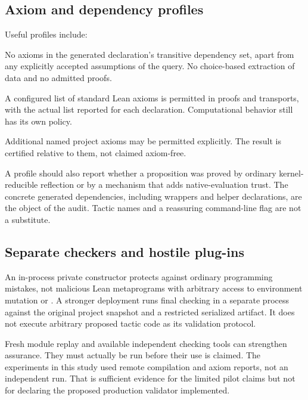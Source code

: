 \documentclass[11pt,a4paper]{article}
\newcommand{\code}[1]{\texttt{\detokenize{#1}}}
\theoremstyle{remark}
\begin{document}
\subsection{Axiom and dependency profiles}

Useful profiles include:
\begin{description}[style=nextline,leftmargin=1.5em]
\item[Strict constructive] No axioms in the generated declaration's transitive dependency set, apart from any explicitly accepted assumptions of the query. No choice-based extraction of data and no admitted proofs.
\item[Standard proof] A configured list of standard Lean axioms is permitted in proofs and transports, with the actual list reported for each declaration. Computational behavior still has its own policy.
\item[Project-relative] Additional named project axioms may be permitted explicitly. The result is certified relative to them, not claimed axiom-free.
\end{description}

A profile should also report whether a proposition was proved by ordinary kernel-reducible reflection or by a mechanism that adds native-evaluation trust. The concrete generated dependencies, including wrappers and helper declarations, are the object of the audit. Tactic names and a reassuring command-line flag are not a substitute.

\subsection{Separate checkers and hostile plug-ins}

An in-process private constructor protects against ordinary programming mistakes, not malicious Lean metaprograms with arbitrary access to environment mutation or \code{IO}. A stronger deployment runs final checking in a separate process against the original project snapshot and a restricted serialized artifact. It does not execute arbitrary proposed tactic code as its validation protocol.

Fresh module replay and available independent checking tools can strengthen assurance. They must actually be run before their use is claimed. The experiments in this study used remote compilation and axiom reports, not an independent \code{lean4checker} run. That is sufficient evidence for the limited pilot claims but not for declaring the proposed production validator implemented.
\end{document}
